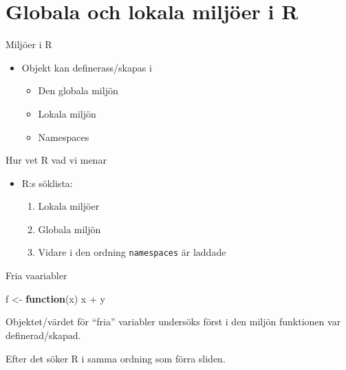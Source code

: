 \documentclass[
  11pt,
  ignorenonframetext,
]{beamer}
\newenvironment{Shaded}{\begin{snugshade}}{\end{snugshade}}
\newcommand{\ControlFlowTok}[1]{\textcolor[rgb]{0.13,0.29,0.53}{\textbf{#1}}}
\newcommand{\NormalTok}[1]{#1}
\newcommand{\OtherTok}[1]{\textcolor[rgb]{0.56,0.35,0.01}{#1}}
\newcommand{\SpecialCharTok}[1]{\textcolor[rgb]{0.00,0.00,0.00}{#1}}
\providecommand{\tightlist}{%
  \setlength{\itemsep}{0pt}\setlength{\parskip}{0pt}}
\begin{document}
\hypertarget{globala-och-lokala-miljuxf6er-i-r}{%
\section{Globala och lokala miljöer i
R}\label{globala-och-lokala-miljuxf6er-i-r}}

\begin{frame}{Miljöer i R}
\protect\hypertarget{miljuxf6er-i-r}{}
\begin{itemize}
\tightlist
\item
  Objekt kan definerass/skapas i

  \begin{itemize}
  \tightlist
  \item
    Den globala miljön
  \item
    Lokala miljön
  \item
    Namespaces
  \end{itemize}
\end{itemize}
\end{frame}

\begin{frame}{Hur vet R vad vi menar}
\protect\hypertarget{hur-vet-r-vad-vi-menar}{}
\begin{itemize}
\tightlist
\item
  R:s söklista:

  \begin{enumerate}
  \tightlist
  \item
    Lokala miljöer
  \item
    Globala miljön
  \item
    Vidare i den ordning \texttt{namespaces} är laddade
  \end{enumerate}
\end{itemize}
\end{frame}

\begin{frame}[fragile]{Fria vaariabler}
\protect\hypertarget{fria-vaariabler}{}
\begin{Shaded}
\begin{Highlighting}[]
\NormalTok{f }\OtherTok{\textless{}{-}} \ControlFlowTok{function}\NormalTok{(x) x }\SpecialCharTok{+}\NormalTok{ y}
\end{Highlighting}
\end{Shaded}

Objektet/värdet för ``fria'' variabler undersöks först i den miljön
funktionen var definerad/skapad.

Efter det söker R i samma ordning som förra sliden.
\end{frame}
\end{document}
